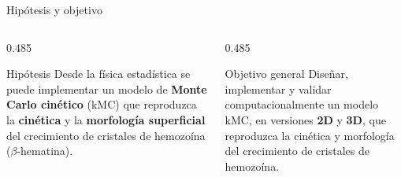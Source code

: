 \documentclass[aspectratio=169,11pt]{beamer}
\begin{document}
\begin{frame}{Hipótesis y objetivo}
  \begin{columns}[T,onlytextwidth]
    \begin{column}{0.485\textwidth}
      \begin{block}{Hipótesis}
        \small Desde la física estadística se puede implementar un modelo de
        \textbf{Monte Carlo cinético} (kMC) que reproduzca la \textbf{cinética} y la
        \textbf{morfología superficial} del crecimiento de cristales de hemozoína
        ($\beta$-hematina).
      \end{block}
    \end{column}
    \begin{column}{0.485\textwidth}
      \begin{block}{Objetivo general}
        \small Diseñar, implementar y validar computacionalmente un modelo kMC,
        en versiones \textbf{2D} y \textbf{3D}, que reproduzca la cinética y morfología
        del crecimiento de cristales de hemozoína.
      \end{block}
    \end{column}
  \end{columns}
  \vspace{1.2em}
  \centering
\end{frame}
\end{document}
